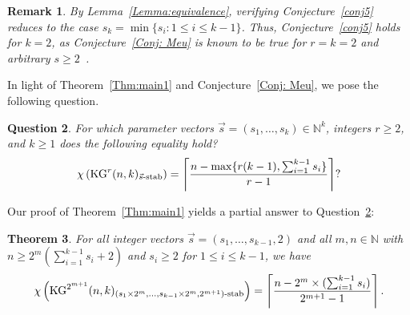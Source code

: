 \documentclass[preprint,12pt,3p]{elsarticle}
\newtheorem{theorem}{Theorem}
\newtheorem{remark}[theorem]{Remark}
\newtheorem{question}[theorem]{Question}
\begin{document}
\begin{remark}
By Lemma~\ref{Lemma:equivalence}, verifying Conjecture~\ref{conj5} reduces to the case $s_k = \min\{s_i : 1 \leq i \leq k-1\}$. Thus, Conjecture~\ref{conj5} holds for $k=2$, as Conjecture~\ref{Conj: Meu} is known to be true for $r=k=2$ and arbitrary $s\geq 2$~\cite{daneshpajouh2021colorings}.
\end{remark}

In light of Theorem~\ref{Thm:main1} and Conjecture~\ref{Conj: Meu}, we pose the following question.

\begin{question}\label{OpenProblem}
For which parameter vectors $\vec{s}=(s_1,\ldots, s_k) \in \mathbb{N}^k$, integers $r\geq 2$, and $k\geq 1$ does the following equality hold?
\[
\chi\left(\mathrm{KG}^{r}(n,k)_{\vec{s}\textup{-stab}}\right) = \left\lceil\frac{n - \max\{r(k-1), \sum_{i=1}^{k-1}s_i\}}{r-1}\right\rceil?
\]
\end{question}

Our proof of Theorem~\ref{Thm:main1} yields a partial answer to Question~\ref{OpenProblem}:

\begin{theorem}\label{Thm:VectorStable}
For all integer vectors $\vec{s}=(s_1,\ldots, s_{k-1},2)$ and all $m, n\in\mathbb{N}$ with $n\geq 2^m(\sum_{i=1}^{k-1}s_i+2)$ and $s_i\geq 2$ for $1\leq i\leq k-1$, we have
\[
\chi\left(\mathrm{KG}^{2^{m+1}}(n,k)_{(s_1\times 2^{m},\ldots,s_{k-1}\times 2^{m}, 2^{m+1})\textup{-stab}}\right) = \left\lceil\frac{n - 2^m\times(\sum_{i=1}^{k-1}s_i)}{2^{m+1}-1}\right\rceil.
\]
\end{theorem}




\medskip
 


\end{document}
